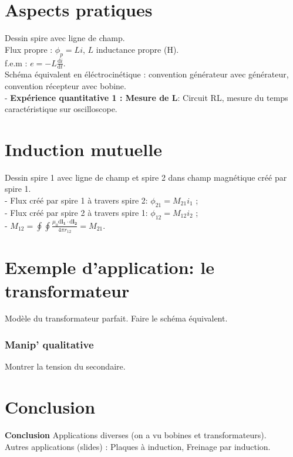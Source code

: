 \documentclass[11pt]{report}
\numberwithin{figure}{section}
\numberwithin{equation}{section}
\numberwithin{table}{section}
\newcommand{\ud}{\mathrm{d}}
\newcommand{\1}{\boldsymbol{1}}
\begin{document}
\section{Aspects pratiques}

Dessin spire avec ligne de champ. \\
    Flux propre : $\phi_p = L i$, $L$ inductance propre (H). \\
    f.e.m : $e = - L \frac{\ud i}{\ud t}$. \\
    Schéma équivalent en éléctrocinétique : convention générateur avec générateur, convention récepteur avec bobine. \\
    - \textbf{Expérience quantitative 1 : Mesure de L}: Circuit RL, mesure du temps caractéristique sur oscilloscope.
    
\section{Induction mutuelle}

Dessin spire 1 avec ligne de champ et spire 2 dans champ magnétique créé par spire 1. \\
    - Flux créé par spire 1 à travers spire 2: $\phi_{21} = M_{21} i_1$ ; \\
    - Flux créé par spire 2 à travers spire 1: $\phi_{12} = M_{12} i_2$ ; \\
    - $M_{12} = \oint \oint \frac{\mu_0 \ud \bm{l_1} \cdot \ud \bm{l_2}}{4 \pi r_{12}} = M_{21}$.

\section{Exemple d'application: le transformateur}

Modèle du transformateur parfait. Faire le schéma équivalent.

\subsubsection*{Manip' qualitative} Montrer la tension du secondaire.



\section*{Conclusion}

\textbf{Conclusion} Applications diverses (on a vu bobines et transformateurs). \\
Autres applications (slides) : Plaques à induction, Freinage par induction.
\end{document}
